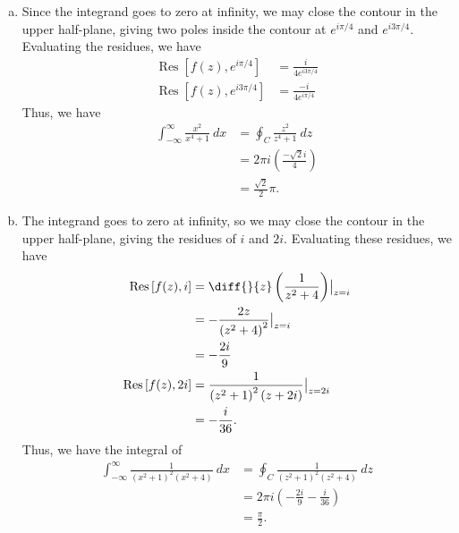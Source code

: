 \documentclass[10pt]{mypackage}
\DeclareMathOperator{\res}{Res}
\begin{document}
\begin{solution}[21.12]\hfill
  \begin{enumerate}[(a)]
    \item Since the integrand goes to zero at infinity, we may close the contour in the upper half-plane, giving two poles inside the contour at $e^{i\pi/4}$ and $e^{i3\pi/4}$. Evaluating the residues, we have
      \begin{align*}
        \res\left[ f(z),e^{i\pi/4} \right] &= \frac{i}{4e^{i3\pi/4}}\\
        \res\left[ f(z),e^{i3\pi/4} \right] &= \frac{-i}{4e^{i\pi/4}}
      \end{align*}
      Thus, we have
      \begin{align*}
        \int_{-\infty}^{\infty}\frac{x^2}{x^4 + 1}\:dx &= \oint_{C}\frac{z^2}{z^4 + 1}\:dz\\
                                                       &= 2\pi i \left( \frac{-\sqrt{2}i}{4} \right)\\
                                                       &= \frac{\sqrt{2}}{2}\pi.
      \end{align*}
    \item The integrand goes to zero at infinity, so we may close the contour in the upper half-plane, giving the residues of $i$ and $2i$. Evaluating these residues, we have
      \begin{align*}
        \res\left[ f(z),i \right] &= \diff{}{z}\left( \frac{1}{z^2 + 4} \right)\bigr\vert_{z=i}\\
                                  &= -\frac{2z}{\left( z^2 + 4 \right)^2}\bigr\vert_{z=i}\\
                                  &= -\frac{2i}{9}\\
        \res\left[ f(z),2i \right] &= \frac{1}{\left( z^2 + 1 \right)^2\left( z+2i \right)}\bigr\vert_{z=2i}\\
                                   &= -\frac{i}{36}.
      \end{align*}
      Thus, we have the integral of
      \begin{align*}
        \int_{-\infty}^{\infty} \frac{1}{\left( x^2 + 1 \right)^2\left( x^2 + 4 \right)}\:dx &= \oint_{C}\frac{1}{\left( z^2 + 1 \right)^2\left( z^2 + 4 \right)}\:dz\\
                                                                                             &= 2\pi i \left( -\frac{2i}{9} - \frac{i}{36} \right)\\
                                                                                             &= \frac{\pi}{2}.

\end{align*}
\end{enumerate}
\end{solution}
\end{document}
